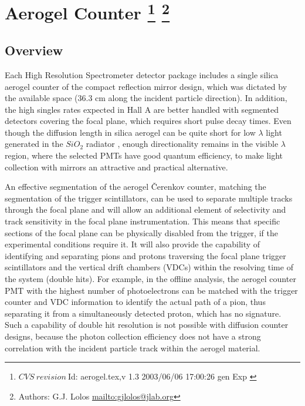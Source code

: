 
\section[Aerogel \Cerenkov Counter]{Aerogel \Cerenkov Counter
\footnote{
  $CVS~revision~ $Id: aerogel.tex,v 1.3 2003/06/06 17:00:26 gen Exp $ $
}
\footnote{Authors: G.J. Lolos \url{mailto:gjlolos@jlab.org}}
}

\subsection{Overview}
Each High Resolution Spectrometer detector package includes a single silica 
aerogel
\Cerenkov counter of the compact reflection mirror design, which was 
dictated by the available space (36.3 cm along the incident particle direction). 
In addition, the high singles
rates expected in Hall A are better handled with segmented detectors
covering the focal plane, which requires short pulse
decay times.
  Even though the diffusion length in
silica aerogel can be quite short for low $\lambda$ light generated in the
$SiO_2$ radiator \cite{Lippert:1993kt}, enough directionality remains in the visible
$\lambda$ region, where the selected PMTs have good quantum efficiency, to make
light collection with mirrors an attractive and practical alternative. 

An effective segmentation of the aerogel \v{C}erenkov counter, matching the 
segmentation of the trigger scintillators, can be used to separate multiple
tracks through the focal plane and will allow an additional element of
selectivity and track sensitivity in the focal plane instrumentation.  This
means that specific sections of the focal plane can be physically disabled from
the trigger, if the experimental conditions require it.  It will also provide
the capability of identifying and separating pions and protons traversing the
focal plane trigger scintillators and the vertical drift chambers (VDCs) within
the resolving time of the system (double hits).  
For example, in the offline
analysis, the aerogel counter PMT with the highest number of photoelectrons can
be matched with the trigger counter and VDC information to identify the actual
path of a pion, thus separating it from a simultaneously detected proton, which
has no \Cerenkov signature.  Such a capability of double hit resolution is
not possible with diffusion \Cerenkov counter designs, because the photon
collection efficiency does not have a strong correlation with the incident
particle track within the aerogel material. 
 
